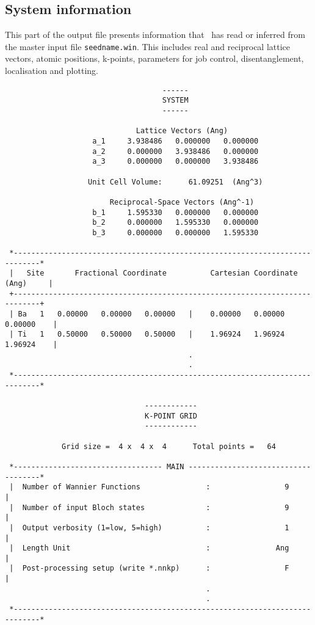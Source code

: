 \subsection{System information}

This part of the output file presents information that \wannier\ has
read or inferred from the master input file {\tt seedname.win}. This
includes real and reciprocal lattice vectors, atomic positions,
k-points, parameters for job control, disentanglement, localisation
and plotting. 

\begin{verbatim}
                                    ------
                                    SYSTEM
                                    ------
 
                              Lattice Vectors (Ang)
                    a_1     3.938486   0.000000   0.000000
                    a_2     0.000000   3.938486   0.000000
                    a_3     0.000000   0.000000   3.938486
 
                   Unit Cell Volume:      61.09251  (Ang^3)
 
                        Reciprocal-Space Vectors (Ang^-1)
                    b_1     1.595330   0.000000   0.000000
                    b_2     0.000000   1.595330   0.000000
                    b_3     0.000000   0.000000   1.595330
  
 *----------------------------------------------------------------------------*
 |   Site       Fractional Coordinate          Cartesian Coordinate (Ang)     |
 +----------------------------------------------------------------------------+
 | Ba   1   0.00000   0.00000   0.00000   |    0.00000   0.00000   0.00000    |
 | Ti   1   0.50000   0.50000   0.50000   |    1.96924   1.96924   1.96924    |
                                          .
                                          . 
 *----------------------------------------------------------------------------*
  
                                ------------
                                K-POINT GRID
                                ------------
  
             Grid size =  4 x  4 x  4      Total points =   64
  
 *---------------------------------- MAIN ------------------------------------*
 |  Number of Wannier Functions               :                 9             |
 |  Number of input Bloch states              :                 9             |
 |  Output verbosity (1=low, 5=high)          :                 1             |
 |  Length Unit                               :               Ang             |
 |  Post-processing setup (write *.nnkp)      :                 F             |
                                              .
                                              .
 *----------------------------------------------------------------------------*
\end{verbatim}

